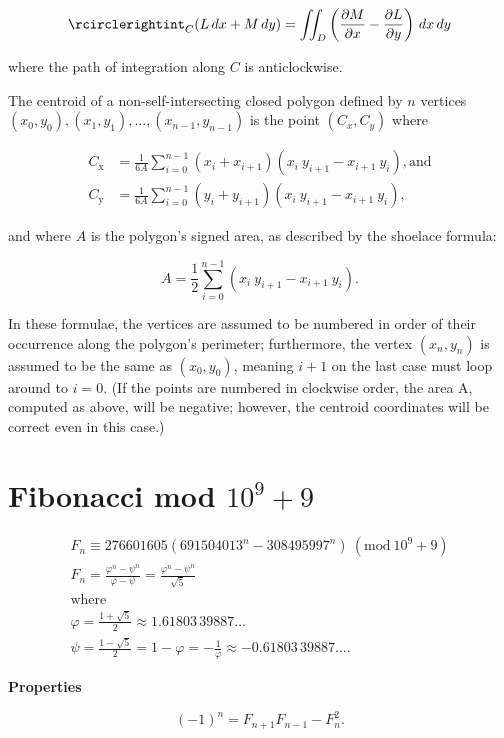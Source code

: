 \documentclass[11pt]{article}
\newcommand{\Mod}[1]{\ (\mathrm{mod}\ #1)}
\begin{document}
\begin{multicols}{3}
$$\rcirclerightint_{C} (L\,dx+M\,dy)=\iint _{D}\left({\frac {\partial M}{\partial x}}-{\frac {\partial L}{\partial y}}\right)\,dx\,dy$$

where the path of integration along $C$ is anticlockwise.

The centroid of a non-self-intersecting closed polygon defined by $n$ vertices $(x_0,y_0), (x_1,y_1), \dots, (x_{n-1},y_{n-1})$ is the point $(C_x, C_y)$ where

\begin{align*}
    C_{\mathrm {x} }&={\frac {1}{6A}}\sum _{i=0}^{n-1}(x_{i}+x_{i+1})(x_{i}\ y_{i+1}-x_{i+1}\ y_{i}), \text{and}\\
C_{\mathrm {y} }&={\frac {1}{6A}}\sum _{i=0}^{n-1}(y_{i}+y_{i+1})(x_{i}\ y_{i+1}-x_{i+1}\ y_{i}),
\end{align*}


and where $A$ is the polygon's signed area, as described by the shoelace formula:

$$A={\frac {1}{2}}\sum _{i=0}^{n-1}(x_{i}\ y_{i+1}-x_{i+1}\ y_{i}).$$

In these formulae, the vertices are assumed to be numbered in order of their occurrence along the polygon's perimeter; furthermore, the vertex $( x_n, y_n )$ is assumed to be the same as $( x_0, y_0 )$, meaning $i+1$ on the last case must loop around to $i=0$. (If the points are numbered in clockwise order, the area A, computed as above, will be negative; however, the centroid coordinates will be correct even in this case.)

\section{Fibonacci mod $10^9+9$}

\begin{gather*}
F_n \equiv 276601605(691504013^n - 308495997^n) \Mod{10^9 + 9} \\
F_{n}={\frac {\varphi ^{n}-\psi ^{n}}{\varphi -\psi }}={\frac {\varphi ^{n}-\psi ^{n}}{\sqrt {5}}}\\
\text{where}\\
\varphi ={\frac {1+{\sqrt {5}}}{2}}\approx 1.61803\,39887\ldots\\
\psi ={\frac {1-{\sqrt {5}}}{2}}=1-\varphi =-{ \frac{1}{\varphi}  }\approx -0.61803\,39887\ldots .
\end{gather*}


\textbf{Properties}

$$(-1)^{n}=F_{n+1}F_{n-1}-F_{n}^{2}.$$


\end{multicols}
\end{document}
